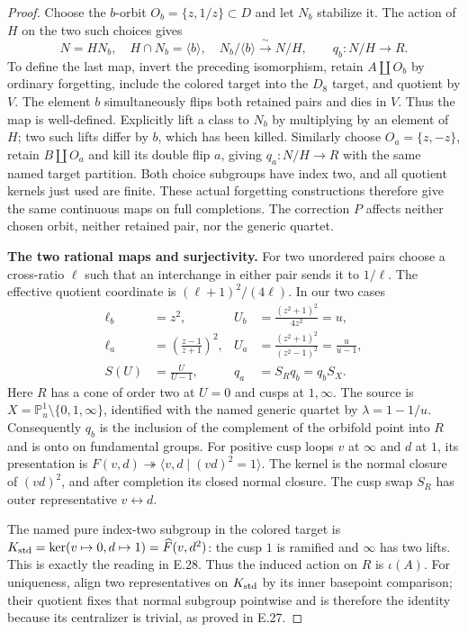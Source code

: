 \begin{proof}
Choose the $b$-orbit $O_b=\{z,1/z\}\subset D$ and let $N_b$
stabilize it.  The action of $H$ on the two such choices gives
\[
 N=HN_b,\quad H\cap N_b=\langle b\rangle,\quad
 N_b/\langle b\rangle\xrightarrow{\ \sim\ }N/H,
 \qquad q_b:N/H\longrightarrow R.
                                                               \tag{E.216}
\]
To define the last map, invert the preceding isomorphism,
retain $A\amalg O_b$ by ordinary forgetting, include the colored
target into the $D_8$ target, and quotient by $V$.
The element $b$ simultaneously flips both retained pairs and
dies in $V$.  Thus the map is well-defined.
Explicitly lift a class to $N_b$ by multiplying by an element
of $H$; two such lifts differ by $b$, which has been killed.
Similarly choose $O_a=\{z,-z\}$, retain $B\amalg O_a$ and kill
its double flip $a$, giving $q_a:N/H\to R$ with the same named
target partition.
Both choice subgroups have index two, and all quotient kernels
just used are finite.  These actual forgetting constructions
therefore give the same continuous maps on full completions.
The correction $P$ affects neither chosen orbit, neither
retained pair, nor the generic quartet.

\par\medskip\noindent\textbf{The two rational maps and surjectivity.}\quad
For two unordered pairs choose a cross-ratio $\ell$ such that
an interchange in either pair sends it to $1/\ell$.
The effective quotient coordinate is $(\ell+1)^2/(4\ell)$.
In our two cases
\[
\begin{aligned}
 \ell_b&=z^2,& U_b&=\frac{(z^2+1)^2}{4z^2}=u,\\
 \ell_a&=\left(\frac{z-1}{z+1}\right)^2,&
 U_a&=\frac{(z^2+1)^2}{(z^2-1)^2}=\frac{u}{u-1},\\
 S(U)&=\frac{U}{U-1},& q_a&=S_Rq_b=q_bS_X.
\end{aligned}                                                   \tag{E.217}
\]
Here $R$ has a cone of order two at $U=0$ and cusps at $1,\infty$.
The source is $X=\mathbb P^1_u\setminus\{0,1,\infty\}$, identified
with the named generic quartet by $\lambda=1-1/u$.
Consequently $q_b$ is the inclusion of the complement of the
orbifold point into $R$ and is onto on fundamental groups.
For positive cusp loops $v$ at $\infty$ and $d$ at $1$, its
presentation is
$F(v,d)\twoheadrightarrow\langle v,d\mid(vd)^2=1\rangle$.
The kernel is the normal closure of $(vd)^2$, and after
completion its closed normal closure.
The cusp swap $S_R$ has outer representative $v\leftrightarrow d$.

The named pure index-two subgroup in the colored target is
$K_{\rm std}=\ker(v\mapsto0,d\mapsto1)=\widehat F(v,d^2)$:
the cusp $1$ is ramified and $\infty$ has two lifts.
This is exactly the reading in E.28.
Thus the induced action on $R$ is $\iota(A)$.
For uniqueness, align two representatives on $K_{\rm std}$ by
its inner basepoint comparison; their quotient fixes that
normal subgroup pointwise and is therefore the identity
because its centralizer is trivial, as proved in E.27.


\end{proof}
